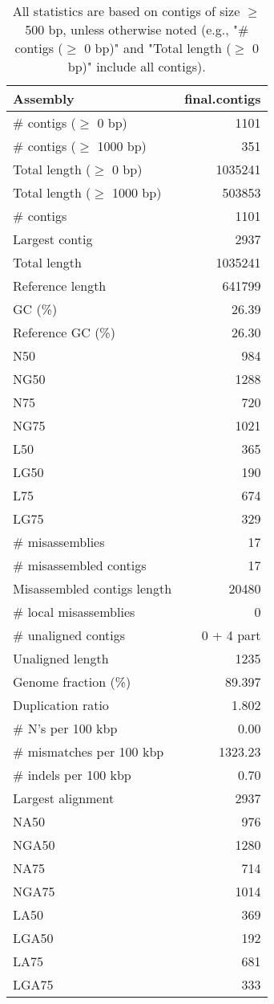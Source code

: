 \documentclass[12pt,a4paper]{article}
\begin{document}
\begin{table}[ht]
\begin{center}
\caption{All statistics are based on contigs of size $\geq$ 500 bp, unless otherwise noted (e.g., "\# contigs ($\geq$ 0 bp)" and "Total length ($\geq$ 0 bp)" include all contigs).}
\begin{tabular}{|l*{1}{|r}|}
\hline
Assembly & final.contigs \\ \hline
\# contigs ($\geq$ 0 bp) & 1101 \\ \hline
\# contigs ($\geq$ 1000 bp) & 351 \\ \hline
Total length ($\geq$ 0 bp) & 1035241 \\ \hline
Total length ($\geq$ 1000 bp) & 503853 \\ \hline
\# contigs & 1101 \\ \hline
Largest contig & 2937 \\ \hline
Total length & 1035241 \\ \hline
Reference length & 641799 \\ \hline
GC (\%) & 26.39 \\ \hline
Reference GC (\%) & 26.30 \\ \hline
N50 & 984 \\ \hline
NG50 & 1288 \\ \hline
N75 & 720 \\ \hline
NG75 & 1021 \\ \hline
L50 & 365 \\ \hline
LG50 & 190 \\ \hline
L75 & 674 \\ \hline
LG75 & 329 \\ \hline
\# misassemblies & 17 \\ \hline
\# misassembled contigs & 17 \\ \hline
Misassembled contigs length & 20480 \\ \hline
\# local misassemblies & 0 \\ \hline
\# unaligned contigs & 0 + 4 part \\ \hline
Unaligned length & 1235 \\ \hline
Genome fraction (\%) & 89.397 \\ \hline
Duplication ratio & 1.802 \\ \hline
\# N's per 100 kbp & 0.00 \\ \hline
\# mismatches per 100 kbp & 1323.23 \\ \hline
\# indels per 100 kbp & 0.70 \\ \hline
Largest alignment & 2937 \\ \hline
NA50 & 976 \\ \hline
NGA50 & 1280 \\ \hline
NA75 & 714 \\ \hline
NGA75 & 1014 \\ \hline
LA50 & 369 \\ \hline
LGA50 & 192 \\ \hline
LA75 & 681 \\ \hline
LGA75 & 333 \\ \hline
\end{tabular}
\end{center}
\end{table}
\end{document}
